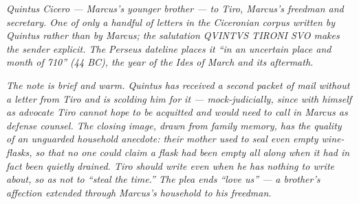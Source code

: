 
\textit{Quintus Cicero --- Marcus's younger brother --- to Tiro,
Marcus's freedman and secretary. One of only a handful of letters in
the Ciceronian corpus written by Quintus rather than by Marcus; the
salutation \textit{QVINTVS TIRONI SVO} makes the sender explicit.
The Perseus dateline places it ``in an uncertain place and month of
710'' (44 BC), the year of the Ides of March and its aftermath.}

\textit{The note is brief and warm. Quintus has received a second
packet of mail without a letter from Tiro and is scolding him for
it --- mock-judicially, since with himself as advocate Tiro cannot
hope to be acquitted and would need to call in Marcus as defense
counsel. The closing image, drawn from family memory, has the
quality of an unguarded household anecdote: their mother used to
seal even empty wine-flasks, so that no one could claim a flask had
been empty all along when it had in fact been quietly drained. Tiro
should write even when he has nothing to write about, so as not to
``steal the time.'' The plea ends ``love us'' --- a brother's
affection extended through Marcus's household to his freedman.}
